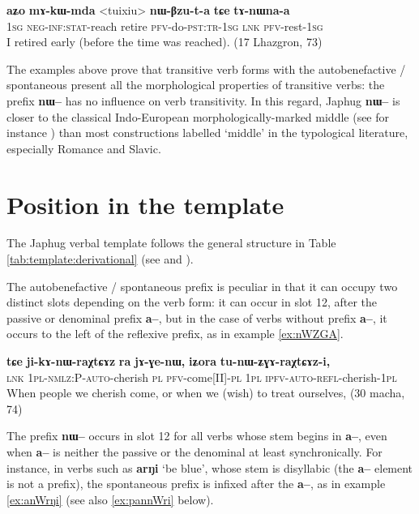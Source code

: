 \documentclass[oldfontcommands,oneside,a4paper,11pt]{article}
\newcommand{\ipa}[1]{\textbf{{\phon\mbox{#1}}}} %
\begin{document}
 \begin{exe}
\ex \label{ex:tuixiu.nWBzuta}
\gll 
\ipa{aʑo} 	\ipa{mɤ-kɯ-mda} 	<tuixiu> 	\ipa{nɯ-βzu-t-a} \ipa{tɕe} 	\ipa{tɤ-nɯna-a} \\
\textsc{1sg} \textsc{neg-inf:stat}-reach retire \textsc{pfv}-do-\textsc{pst:tr-1sg} \textsc{lnk} \textsc{pfv}-rest-\textsc{1sg} \\
\glt I retired early (before the time was reached). (17 Lhazgron, 73)
\end{exe} 

The examples above prove that transitive verb forms with the autobenefactive / spontaneous present all the morphological  properties of transitive verbs: the prefix \ipa{nɯ--} has no influence on verb transitivity. In this regard, Japhug \ipa{nɯ--} is closer to the classical Indo-European morphologically-marked middle (see for instance  \citealt[19]{pooth14diathesen}) than most constructions labelled `middle' in the typological literature, especially Romance and Slavic.

\section{Position in the template}
The Japhug verbal template follows the general structure in Table \ref{tab:template:derivational} (see \citealt{jacques12incorp} and \citealt{jacques13harmonization}). 

The autobenefactive / spontaneous prefix is peculiar in that it can occupy two distinct slots depending on the verb form: it can occur  in slot 12, after the passive or denominal prefix \ipa{a--}, but in the case of verbs without prefix \ipa{a--}, it occurs to the left of the reflexive prefix, as in example \ref{ex:nWZGA}.

\begin{exe}
\ex \label{ex:nWZGA}
\gll 
\ipa{tɕe}  	\ipa{ji-kɤ-nɯ-raχtɕɤz}  	\ipa{ra}  	\ipa{jɤ-ɣe-nɯ,}  	\ipa{iʑora}  	\ipa{tu-nɯ-ʑɣɤ-raχtɕɤz-i,}  \\
\textsc{lnk} \textsc{1pl-nmlz:P-auto}-cherish \textsc{pl} \textsc{pfv}-come[II]-\textsc{pl} \textsc{1pl} \textsc{ipfv-auto-refl}-cherish-\textsc{1pl} \\
\glt When people we cherish come, or when we (wish) to treat ourselves, (30 macha, 74)
\end{exe}

The prefix \ipa{nɯ--} occurs in slot 12 for all verbs whose stem begins in \ipa{a--}, even when   \ipa{a--} is neither the passive or the denominal at least synchronically. For instance, in verbs such as \ipa{arŋi} `be blue', whose stem is disyllabic (the \ipa{a--} element is not a prefix), the spontaneous prefix is infixed after the \ipa{a--}, as in  example \ref{ex:anWrŋi} (see also \ref{ex:pannWri} below).
\end{document}
